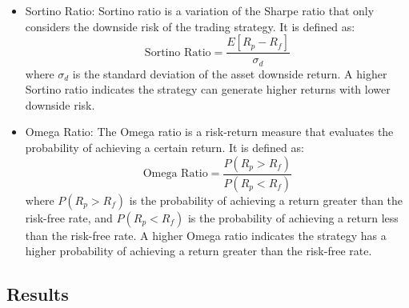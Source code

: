 \documentclass[conference]{IEEEtran}
\begin{document}
\begin{itemize}
  \item Sortino Ratio: Sortino ratio is a variation of the Sharpe ratio that only considers the downside risk of the trading strategy. It is defined as:
    \begin{equation}
      \text{Sortino Ratio} = \frac{E[R_p - R_f]}{\sigma_d}
    \end{equation}
    where $\sigma_d$ is the standard deviation of the asset downside return.
    A higher Sortino ratio indicates the strategy can generate higher returns with lower downside risk.
  \item Omega Ratio: The Omega ratio is a risk-return measure that evaluates the probability of achieving a certain return. It is defined as:
    \begin{equation}
      \text{Omega Ratio} = \frac{P(R_p > R_f)}{P(R_p < R_f)}
    \end{equation}
    where $P(R_p > R_f)$ is the probability of achieving a return greater than the risk-free rate, and $P(R_p < R_f)$ is the probability of achieving a return less than the risk-free rate.
    A higher Omega ratio indicates the strategy has a higher probability of achieving a return greater than the risk-free rate.
\end{itemize}

\subsection{Results}

\end{document}
